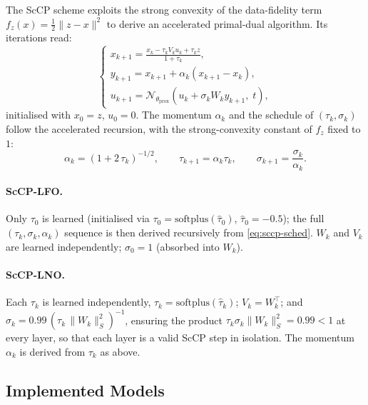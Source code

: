 \documentclass[a4paper,11pt]{article}
\theoremstyle{plain}{\theorembodyfont{\rmfamily}%
\newtheorem{proposition}[theorem]{Proposition}}
\theoremstyle{plain}{\theorembodyfont{\rmfamily}%
\newtheorem{notation}[theorem]{Notation}}
\theoremstyle{plain}{\theorembodyfont{\rmfamily}%
\newtheorem{assumption}[theorem]{Assumption}}
\theoremstyle{plain}{\theorembodyfont{\rmfamily}%
\newtheorem{problem}[theorem]{Problem}}
\theoremstyle{plain}{\theorembodyfont{\rmfamily}%
\newtheorem{example}[theorem]{Example}}
\theoremstyle{plain}{\theorembodyfont{\rmfamily}%
\newtheorem{remark}[theorem]{Remark}}
\theoremstyle{plain}{\theorembodyfont{\rmfamily}%
\newtheorem{definition}[theorem]{Definition}}
\theoremstyle{plain}{\theorembodyfont{\rmfamily}%
\newtheorem{question}[theorem]{Question}}
\numberwithin{equation}{section}
\begin{document}
The ScCP scheme exploits the strong convexity of the data-fidelity term
$f_z(x)=\frac{1}{2}\|z-x\|^2$ to derive an accelerated primal-dual algorithm.
Its iterations read:
\begin{equation}
\label{eq:sccp_iter}
    \begin{cases}
        \displaystyle
        x_{k+1} = \frac{x_k - \tau_k V_k u_k + \tau_k z}{1 + \tau_k}, \\[8pt]
        \displaystyle
        y_{k+1} = x_{k+1} + \alpha_k (x_{k+1} - x_k), \\[6pt]
        \displaystyle
        u_{k+1} = \mathcal{N}_{\theta_{\text{prox}}}
            \!\left(u_k + \sigma_k W_k y_{k+1},\; t\right),
    \end{cases}
\end{equation}
initialised with $x_0 = z$, $u_0 = 0$. The momentum $\alpha_k$ and the schedule of
$(\tau_k, \sigma_k)$ follow the accelerated recursion, with the strong-convexity
constant of $f_z$ fixed to $1$:
\begin{equation}
    \alpha_k = \left(1 + 2\,\tau_k\right)^{-1/2},
    \qquad
    \tau_{k+1} = \alpha_k \tau_k,
    \qquad
    \sigma_{k+1} = \frac{\sigma_k}{\alpha_k}.
    \label{eq:sccp-sched}
\end{equation}

\paragraph{ScCP-LFO.} Only $\tau_0$ is learned (initialised via
$\tau_0 = \mathrm{softplus}(\hat\tau_0)$, $\hat\tau_0 = -0.5$); the full
$(\tau_k, \sigma_k, \alpha_k)$ sequence is then derived recursively from
\eqref{eq:sccp-sched}. $W_k$ and $V_k$ are learned independently; $\sigma_0 = 1$
(absorbed into $W_k$).

\paragraph{ScCP-LNO.} Each $\tau_k$ is learned independently,
$\tau_k = \mathrm{softplus}(\hat\tau_k)$; $V_k = W_k^\top$; and
$\sigma_k = 0.99\,(\tau_k\,\|W_k\|_S^2)^{-1}$, ensuring the product
$\tau_k\sigma_k\|W_k\|_S^2 = 0.99 < 1$ at every layer, so that each layer is a
valid ScCP step in isolation. The momentum $\alpha_k$ is derived from $\tau_k$ as
above.

\subsection{Implemented Models}
\label{subsec:models}
\end{document}

